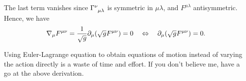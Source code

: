 \documentclass{article}
\begin{document}
The last term vanishes since $ \Gamma\indices{^{\nu}_{\mu \lambda}} $ is symmetric in $ \mu \lambda $, and $ F^{\mu \lambda} $ antisymmetric. Hence, we have
\begin{equation}
	\nabla_{\mu} F^{\mu \nu} = \frac{1}{\sqrt{g}} \partial_{\mu} \qty(\sqrt{g} F^{\mu \nu}) = 0 \quad \Leftrightarrow \quad \partial_{\mu} \qty(\sqrt{g} F^{\mu \nu}) = 0.
\end{equation}
\begin{note}
	Using Euler-Lagrange equation to obtain equations of motion instead of varying the action directly is a waste of time and effort. If you don't believe me, have a go at the above derivation.
\end{note}
\end{document}
